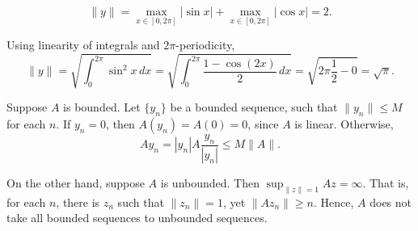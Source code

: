 \documentclass{homework}
\begin{document}
\begin{solution}
$$
\|y \| = \max_{x\in[0,2\pi]} |\sin x| + \max_{x\in[0,2\pi]} |\cos x| = 2.  
$$
\end{solution}
\newpage

\begin{solution}
Using linearity of integrals and $2\pi$-periodicity,
$$
\|y\| = \sqrt{\int_0^{2\pi} \sin^2 x\, dx }  
= \sqrt{\int_0^{2\pi} \frac{1 - \cos(2x)}{2}\, dx }  
= \sqrt{ 2\pi \frac 12 - 0} = \sqrt{\pi}.
$$
\end{solution}

\begin{solution}
Suppose $A$ is bounded. Let $\{y_n\}$ be a bounded sequence, such that $\|y_n\| \le M$ for each $n$. If $y_n = 0$, then $A (y_n) = A (0) = 0$, since $A$ is linear.  Otherwise, 
$$
A y_n = |y_n| A \frac {y_n}{|y_n|} \le M \|A\|.
$$

On the other hand, suppose $A$ is unbounded.  Then $\sup_{\|z\|=1}Az = \infty$.  That is, for each $n$, there is $z_n$ such that $\|z_n\| = 1$, yet $\|A z_n\| \ge n$.  Hence, $A$ does not take all bounded sequences to unbounded sequences.
\end{solution}

\end{document}
